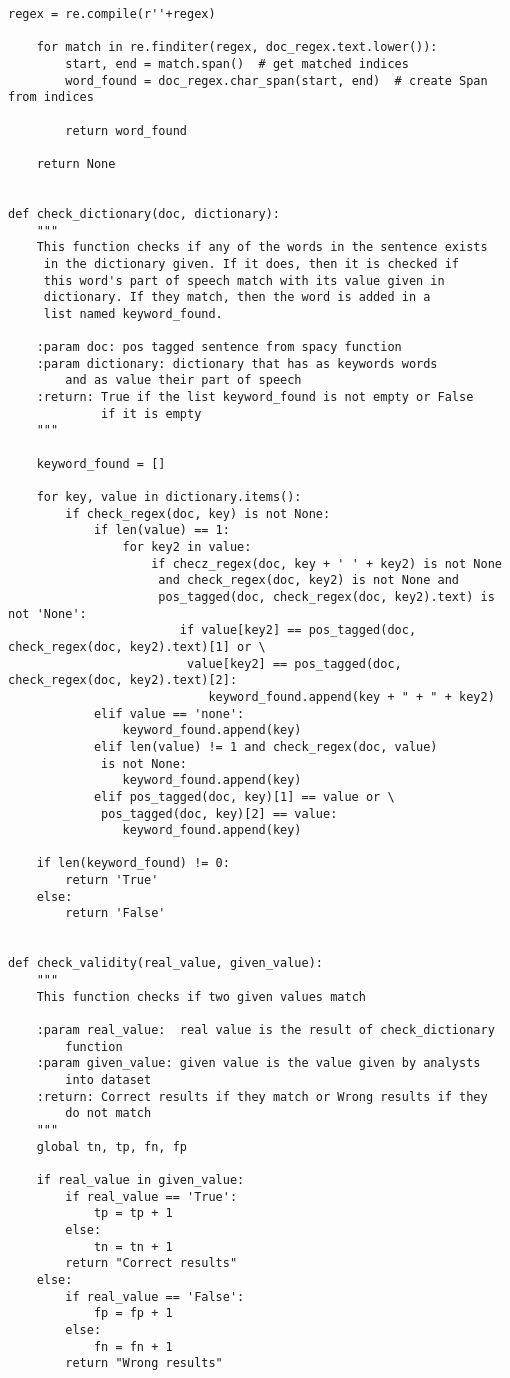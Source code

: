 \begin{lstlisting}[language=iPython]
	regex = re.compile(r''+regex)
	
	for match in re.finditer(regex, doc_regex.text.lower()):
		start, end = match.span()  # get matched indices
		word_found = doc_regex.char_span(start, end)  # create Span from indices
		
		return word_found
	
	return None


def check_dictionary(doc, dictionary):
	"""
	This function checks if any of the words in the sentence exists
	 in the dictionary given. If it does, then it is checked if 
	 this word's part of speech match with its value given in 
	 dictionary. If they match, then the word is added in a 
	 list named keyword_found.
	
	:param doc: pos tagged sentence from spacy function
	:param dictionary: dictionary that has as keywords words 
		and as value their part of speech
	:return: True if the list keyword_found is not empty or False 
			 if it is empty
	"""
	
	keyword_found = []
	
	for key, value in dictionary.items():
		if check_regex(doc, key) is not None:
			if len(value) == 1:
				for key2 in value:
					if checz_regex(doc, key + ' ' + key2) is not None 
					 and check_regex(doc, key2) is not None and 
					 pos_tagged(doc, check_regex(doc, key2).text) is not 'None':
						if value[key2] == pos_tagged(doc, check_regex(doc, key2).text)[1] or \
						 value[key2] == pos_tagged(doc, check_regex(doc, key2).text)[2]:
							keyword_found.append(key + " + " + key2)
			elif value == 'none':
				keyword_found.append(key)
			elif len(value) != 1 and check_regex(doc, value) 
			 is not None:
				keyword_found.append(key)
			elif pos_tagged(doc, key)[1] == value or \
			 pos_tagged(doc, key)[2] == value:
				keyword_found.append(key)
	
	if len(keyword_found) != 0:
		return 'True'
	else:
		return 'False'


def check_validity(real_value, given_value):
	"""
	This function checks if two given values match
	
	:param real_value:  real value is the result of check_dictionary
		function
	:param given_value: given value is the value given by analysts 
		into dataset
	:return: Correct results if they match or Wrong results if they
		do not match
	"""
	global tn, tp, fn, fp
	
	if real_value in given_value:
		if real_value == 'True':
			tp = tp + 1
		else:
			tn = tn + 1
		return "Correct results"
	else:
		if real_value == 'False':
			fp = fp + 1
		else:
			fn = fn + 1
		return "Wrong results"



\end{lstlisting}
